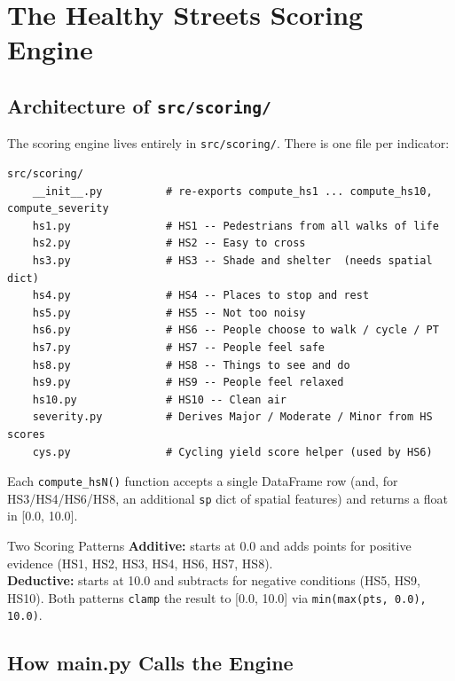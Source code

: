 \documentclass[11pt,a4paper,openany]{book}
\begin{document}
\chapter{The Healthy Streets Scoring Engine}

\section{Architecture of \texttt{src/scoring/}}

The scoring engine lives entirely in \texttt{src/scoring/}. There is one file per indicator:

\begin{lstlisting}[style=text]
src/scoring/
    __init__.py          # re-exports compute_hs1 ... compute_hs10, compute_severity
    hs1.py               # HS1 -- Pedestrians from all walks of life
    hs2.py               # HS2 -- Easy to cross
    hs3.py               # HS3 -- Shade and shelter  (needs spatial dict)
    hs4.py               # HS4 -- Places to stop and rest
    hs5.py               # HS5 -- Not too noisy
    hs6.py               # HS6 -- People choose to walk / cycle / PT
    hs7.py               # HS7 -- People feel safe
    hs8.py               # HS8 -- Things to see and do
    hs9.py               # HS9 -- People feel relaxed
    hs10.py              # HS10 -- Clean air
    severity.py          # Derives Major / Moderate / Minor from HS scores
    cys.py               # Cycling yield score helper (used by HS6)
\end{lstlisting}

Each \texttt{compute\_hsN()} function accepts a single DataFrame row (and, for HS3/HS4/HS6/HS8, an additional \texttt{sp} dict of spatial features) and returns a float in [0.0, 10.0].

\begin{tipbox}{Two Scoring Patterns}
\textbf{Additive:} starts at 0.0 and adds points for positive evidence (HS1, HS2, HS3, HS4, HS6, HS7, HS8).\\
\textbf{Deductive:} starts at 10.0 and subtracts for negative conditions (HS5, HS9, HS10).
Both patterns \texttt{clamp} the result to [0.0, 10.0] via \texttt{min(max(pts, 0.0), 10.0)}.
\end{tipbox}

\section{How main.py Calls the Engine}
\end{document}
